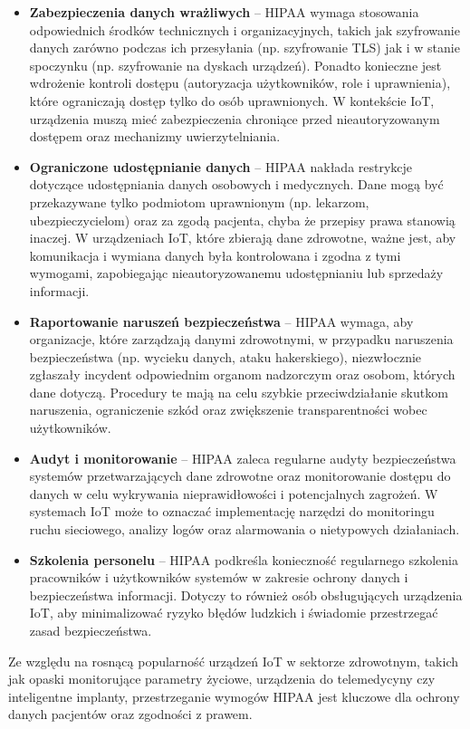 \begin{itemize}
\item \textbf{Zabezpieczenia danych wrażliwych} – HIPAA wymaga stosowania odpowiednich środków technicznych i organizacyjnych, takich jak szyfrowanie danych zarówno podczas ich przesyłania (np. szyfrowanie TLS) jak i w stanie spoczynku (np. szyfrowanie na dyskach urządzeń). Ponadto konieczne jest wdrożenie kontroli dostępu (autoryzacja użytkowników, role i uprawnienia), które ograniczają dostęp tylko do osób uprawnionych. W kontekście IoT, urządzenia muszą mieć zabezpieczenia chroniące przed nieautoryzowanym dostępem oraz mechanizmy uwierzytelniania.

\item \textbf{Ograniczone udostępnianie danych} – HIPAA nakłada restrykcje dotyczące udostępniania danych osobowych i medycznych. Dane mogą być przekazywane tylko podmiotom uprawnionym (np. lekarzom, ubezpieczycielom) oraz za zgodą pacjenta, chyba że przepisy prawa stanowią inaczej. W urządzeniach IoT, które zbierają dane zdrowotne, ważne jest, aby komunikacja i wymiana danych była kontrolowana i zgodna z tymi wymogami, zapobiegając nieautoryzowanemu udostępnianiu lub sprzedaży informacji.

\item \textbf{Raportowanie naruszeń bezpieczeństwa} – HIPAA wymaga, aby organizacje, które zarządzają danymi zdrowotnymi, w przypadku naruszenia bezpieczeństwa (np. wycieku danych, ataku hakerskiego), niezwłocznie zgłaszały incydent odpowiednim organom nadzorczym oraz osobom, których dane dotyczą. Procedury te mają na celu szybkie przeciwdziałanie skutkom naruszenia, ograniczenie szkód oraz zwiększenie transparentności wobec użytkowników.

\item \textbf{Audyt i monitorowanie} – HIPAA zaleca regularne audyty bezpieczeństwa systemów przetwarzających dane zdrowotne oraz monitorowanie dostępu do danych w celu wykrywania nieprawidłowości i potencjalnych zagrożeń. W systemach IoT może to oznaczać implementację narzędzi do monitoringu ruchu sieciowego, analizy logów oraz alarmowania o nietypowych działaniach.

\item \textbf{Szkolenia personelu} – HIPAA podkreśla konieczność regularnego szkolenia pracowników i użytkowników systemów w zakresie ochrony danych i bezpieczeństwa informacji. Dotyczy to również osób obsługujących urządzenia IoT, aby minimalizować ryzyko błędów ludzkich i świadomie przestrzegać zasad bezpieczeństwa.
\end{itemize}
Ze względu na rosnącą popularność urządzeń IoT w sektorze zdrowotnym, takich jak opaski monitorujące parametry życiowe, urządzenia do telemedycyny czy inteligentne implanty, przestrzeganie wymogów HIPAA jest kluczowe dla ochrony danych pacjentów oraz zgodności z prawem.

